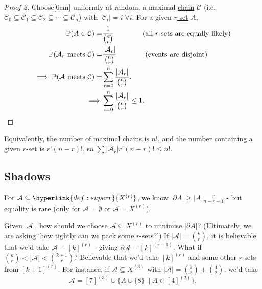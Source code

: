 \documentclass{article}
\let\subset\subseteq
\begin{document}
\begin{proof}[Proof 2]
  Choose[0cm] uniformly at random, a maximal \hyperlink{def:chain}{chain} $\mathcal{C}$ (i.e.\ $\mathcal{C}_0 \subset \mathcal{C}_1 \subset \mathcal{C}_2 \subset \dotsb \subset \mathcal{C}_n$) with $|\mathcal{C}_i| = i \; \forall i$.
  For a given \hyperlink{def:superr}{$r$-set} $A$,
 \begin{align*}\mathbb{P}(A \in \mathcal{C}) = &\frac{1}{\binom{n}{r}} \qquad \qquad \text{(all $r$-sets are equally likely)} \\
    \mathbb{P}(\mathcal{A}_r \text{ meets } \mathcal{C}) = &\frac{|\mathcal{A}_r|}{\binom{n}{r}} \qquad \qquad \text{(events are disjoint)} \\
    \implies \mathbb{P}(\mathcal{A} \text{ meets }\mathcal{C}) = &\sum_{r=0}^n \frac{|\mathcal{A}_r|}{\binom{n}{r}}. \\
    \implies &\sum_{i=0}^n \frac{|\mathcal{A}_r|}{\binom{n}{r}} \leq 1. \qedhere
  \end{align*}
\end{proof}
\begin{remark}
  Equivalently, the number of maximal \hyperlink{def:chain}{chains} is $n!$, and the number containing a given $r$-set is $r! (n-r)!$, so $\sum |\mathcal{A}_r| r! (n-r)! \leq n!$.
\end{remark}
\subsection{Shadows}
For $\mathcal{A} \subset \hyperlink{def:superr}{X^{(r)}}$, we know $|\partial A| \geq |A| \frac{r}{n-r+1}$ - but equality is rare (only for $\mathcal{A} = \emptyset$ or $\mathcal{A} = X^{(r)}$).

Given $|\mathcal{A}|$, how should we choose $\mathcal{A} \subset X^{(r)}$ to minimise $|\partial A|$?
(Ultimately, we are asking `how tightly can we pack some $r$-sets?')
If $|\mathcal{A}| = \binom{k}{r}$, it is believable that we'd take $\mathcal{A} = [k]^{(r)}$ - giving $\partial \mathcal{A} = [k]^{(r-1)}$.
What if $\binom{k}{r} < |\mathcal{A}| < \binom{k+1}{r}$? Believable that we'd take $[k]^{(r)}$ and some other $r$-sets from $[k+1]^{(r)}$.
For instance, if $\mathcal{A} \subset X^{(3)}$ with $|\mathcal{A}| = \binom{7}{3} + \binom{4}{2}$, we'd take
\begin{equation*}\mathcal{A} = [7]^{(3)} \cup \{A \cup \{8\} \| A\in [4]^{(2)}\}.\end{equation*}
\end{document}
